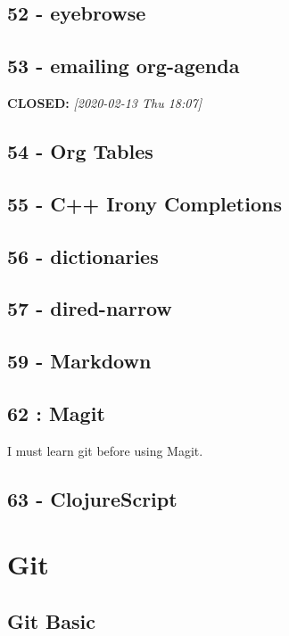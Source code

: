 \documentclass[11pt]{article}
\begin{document}
\subsection{52 - eyebrowse}
\label{sec:orgc677dec}
\subsection{53 - emailing org-agenda}
\label{sec:orgc581106}
\noindent\textbf{CLOSED:} \textit{[2020-02-13 Thu 18:07]}\\
\subsection{54 - Org Tables}
\label{sec:orgae6aeb3}
\subsection{55 - C++ Irony Completions}
\label{sec:org5d6e4b9}
\subsection{56 - dictionaries}
\label{sec:org670c4b1}
\subsection{57 - dired-narrow}
\label{sec:org4e76f62}
\subsection{59 - Markdown}
\label{sec:org62f97c9}
\subsection{62 : Magit}
\label{sec:orgcb68262}
I must learn git before using Magit.

\subsection{63 - ClojureScript}
\label{sec:org539db2d}
\section{Git}
\label{sec:orgd2d1371}
\subsection{Git Basic}
\label{sec:org53b3f19}
\end{document}
